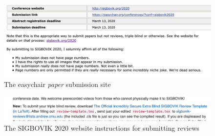 \documentclass[12pt]{sigbovik-review}
\author{Definitely not the SIGBOVIK webmaster}
\begin{document}
\maketitle

\begin{figure}[!h]
\centering
\includegraphics[width=.9\textwidth]{easychair}
\caption{The easychair \emph{paper} submission site}
\end{figure}

\begin{figure}[!h]
\centering
\includegraphics[width=.9\textwidth]{website}
\caption{The SIGBOVIK 2020 website instructions for submitting reviews}
\end{figure}
\end{document}
